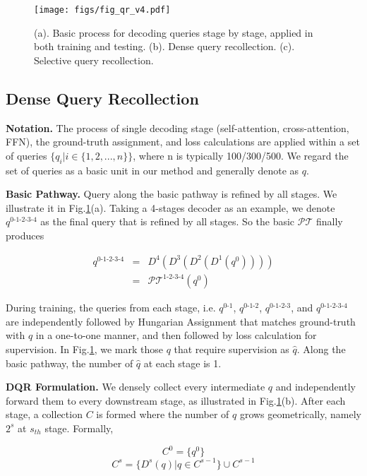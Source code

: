 \documentclass[10pt,twocolumn,letterpaper]{article}
\begin{document}
\begin{figure}
    \centering
    \texttt{[image: figs/fig\_qr\_v4.pdf]}
    \caption{(a). Basic process for decoding queries stage by stage, applied in both training and testing. (b). Dense query recollection. (c). Selective query recollection.}
        \label{fig:qr}
\end{figure}

\subsection{Dense Query Recollection}
\textbf{Notation.} The process of single decoding stage (self-attention, cross-attention, FFN), the ground-truth assignment, and loss calculations are applied within a set of queries $\{q_{i}|i\in \{1,2,...,n\}\}$, where n is typically 100/300/500. We regard the set of queries as a basic unit in our method and generally denote as $q$.

\textbf{Basic Pathway.} Query along the basic pathway is refined by all stages. We illustrate it in Fig.\ref{fig:qr}(a). Taking a 4-stages decoder as an example, we denote $q^{0\text{-}1\text{-}2\text{-}3\text{-}4}$ as the final query that is refined by all stages.  So the basic $\mathcal{PT}$ finally produces

\begin{eqnarray}
\label{eq:denseQR0}
    q^{0\text{-}1\text{-}2\text{-}3\text{-}4} & = & D^{4}(D^{3}(D^{2}(D^{1}(q^0)))) \\
    &  = & \mathcal{PT}^{1\text{-}2\text{-}3\text{-}4}(q^0)
\end{eqnarray}

During training, the queries from each stage, i.e. $q^{0\text{-}1}$, $q^{0\text{-}1\text{-}2}$, $q^{0\text{-}1\text{-}2\text{-}3}$, and $q^{0\text{-}1\text{-}2\text{-}3\text{-}4}$ are independently followed by Hungarian Assignment that matches ground-truth with $q$ in a one-to-one manner, and then followed by loss calculation for supervision. In Fig.\ref{fig:qr}, we mark those $q$ that require supervision as $\hat{q}$. Along the basic pathway, the number of $\hat{q}$ at each stage is 1. 


\textbf{DQR Formulation.} We densely collect every intermediate $q$ and independently forward them to every downstream stage, as illustrated in Fig.\ref{fig:qr}(b). After each stage, a collection $C$ is formed where the number of $q$ grows geometrically, namely $2^{s}$ at $s_{th}$ stage. Formally,

\begin{equation}
\label{eq:denseQR1}
    C^0 = \{q^0\} 
\end{equation}
\begin{equation}
\label{eq:denseQR2}
    C^s = \{D^s(q)|q\in C^{s-1}\} \cup C^{s-1}
\end{equation}
\end{document}
